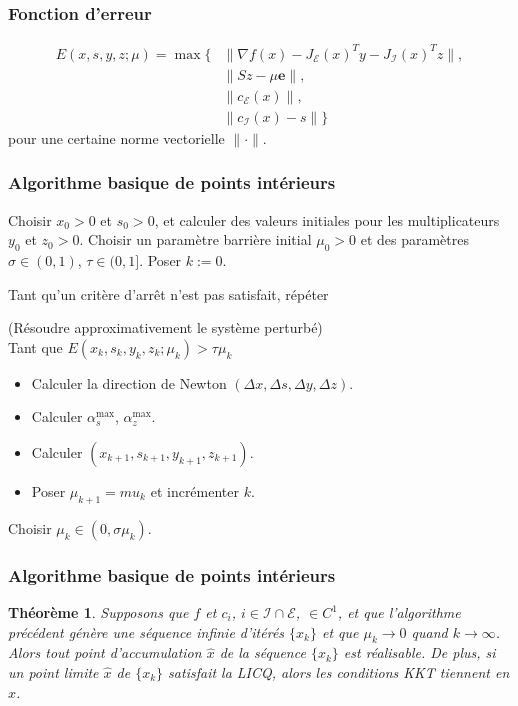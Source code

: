 \documentclass[usepdftitle=false]{beamer}
\newtheorem{thm}{Théorème}
\def\cE{\mathcal{E}}
\def\cI{\mathcal{I}}
\def\be{\boldsymbol{e}}
\begin{document}
\begin{frame}
\frametitle{Fonction d'erreur}

\begin{align*}
E(x, s, y, z; \mu) = \max
\{ &
\| \nabla f(x) - J_{\cE}(x)^T y - J_{\cI}(x)^T z \|, \\
&\| Sz - \mu\be \|, \\
&\| c_{\cE}(x) \|, \\
&\| c_{\cI}(x) - s \|
\}
\end{align*}
pour une certaine norme vectorielle $\| \cdot \|$.

\end{frame}

\begin{frame}
\frametitle{Algorithme basique de points intérieurs}

Choisir $x_0 > 0$ et $s_0 > 0$, et calculer des valeurs initiales pour les multiplicateurs $y_0$ et $z_0 > 0$.
Choisir un paramètre barrière initial $\mu_0 > 0$ et des paramètres $\sigma \in (0, 1)$, $\tau \in (0, 1]$.
Poser $k := 0$.

\mbox{}

Tant qu'un critère d'arrêt n'est pas satisfait, répéter

\hfill\begin{minipage}{\dimexpr\textwidth-1cm}
(Résoudre approximativement le système perturbé) \\
Tant que $E(x_k, s_k, y_k, z_k; \mu_k) > \tau\mu_k$
\begin{itemize}
	\item
	Calculer la direction de Newton $(\Delta x, \Delta s, \Delta y, \Delta z )$.
	\item
	Calculer $\alpha^{\max}_s$, $\alpha^{\max}_z$.
	\item
Calculer $(x_{k+1}, s_{k+1}, y_{k+1}, z_{k+1})$.
\item
Poser $\mu_{k+1} = mu_k$ et incrémenter $k$.
\end{itemize}
Choisir $\mu_k \in (0, \sigma \mu_k )$.
\end{minipage}

\end{frame}

\begin{frame}
\frametitle{Algorithme basique de points intérieurs}

\begin{thm}
Supposons que $f$ et $c_i$, $i \in \cI \cap \cE$, $\in C^1$, et que l'algorithme précédent génère une séquence infinie d'itérés $\{ x_k \}$ et que $\mu_k \rightarrow 0$ quand $k \rightarrow \infty$.
Alors tout point d'accumulation $\hat{x}$ de la séquence $\{ x_k \}$ est réalisable.
De plus, si un point limite $\hat{x}$ de $\{ x_k \}$ satisfait la LICQ, alors les conditions KKT tiennent en $\hat{x}$.
\end{thm}

\end{frame}
\end{document}

